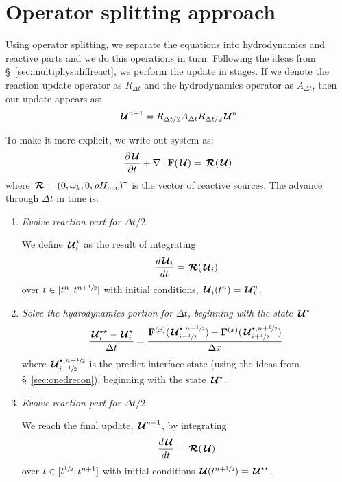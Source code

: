 \section{Operator splitting approach}

Using operator splitting, we separate the equations into hydrodynamics
and reactive parts and we do this operations in turn.  Following the
ideas from \S~\ref{sec:multiphys:diffreact}, we perform the update
in stages.  If we denote the reaction update operator as $R_{\Delta t}$
and the hydrodynamics operator as $A_{\Delta t}$, then our update 
appears as:
\begin{equation}
  {\,\boldsymbol{\mathcal{U}}}^{n+1} = R_{\Delta t/2} A_{\Delta t} R_{\Delta t/2} {\,\boldsymbol{\mathcal{U}}}^n
\end{equation}

To make it more explicit, we write out system as:
\begin{equation}
{\frac{{\partial{\,\boldsymbol{\mathcal{U}}}}}{\partial t}} + \nabla \cdot {\bf F}({\,\boldsymbol{\mathcal{U}}}) = {\,\boldsymbol{\mathcal{R}}}({\,\boldsymbol{\mathcal{U}}})
\end{equation}
where ${\,\boldsymbol{\mathcal{R}}} = (0, {\dot{\omega}}_k, 0, \rho {H_\mathrm{nuc}})^\intercal$ is the vector
of reactive sources.  The advance through $\Delta t$ in time is:
\begin{enumerate}
\item {\em Evolve reaction part for $\Delta t/2$}.

  We define ${\,\boldsymbol{\mathcal{U}}}_i^\star$ as the result of integrating
  \begin{equation}
    \frac{d{\,\boldsymbol{\mathcal{U}}}_i}{dt} = {\,\boldsymbol{\mathcal{R}}}({\,\boldsymbol{\mathcal{U}}}_i)
  \end{equation}
  over $t \in [t^n, t^{n+{\sfrac{1}{2}}}]$ with initial conditions, 
  ${\,\boldsymbol{\mathcal{U}}}_i(t^n) = {\,\boldsymbol{\mathcal{U}}}_i^n$.

\item {\em Solve the hydrodynamics portion for $\Delta t$, beginning
    with the state ${\,\boldsymbol{\mathcal{U}}}^\star$}
   \begin{equation}
     \frac{{\,\boldsymbol{\mathcal{U}}}^{\star\star}_i - {\,\boldsymbol{\mathcal{U}}}^\star_i}{\Delta t} =
      \frac{{\bf F}^{(x)}({\,\boldsymbol{\mathcal{U}}}^{\star,n+{\sfrac{1}{2}}}_{i-{\sfrac{1}{2}}}) - {\bf F}^{(x)}({\,\boldsymbol{\mathcal{U}}}^{\star,n+{\sfrac{1}{2}}}_{i+{\sfrac{1}{2}}})}{\Delta x}
   \end{equation}
  where ${\,\boldsymbol{\mathcal{U}}}^{\star,n+{\sfrac{1}{2}}}_{i-{\sfrac{1}{2}}}$ is the predict interface state
  (using the ideas from \S~\ref{sec:onedrecon}), beginning with the state
  ${\,\boldsymbol{\mathcal{U}}}^\star$.

\item {\em Evolve reaction part for $\Delta t/2$}

  We reach the final update, ${\,\boldsymbol{\mathcal{U}}}^{n+1}$, by integrating
  \begin{equation}
    \frac{d{\,\boldsymbol{\mathcal{U}}}}{dt} = {\,\boldsymbol{\mathcal{R}}}({\,\boldsymbol{\mathcal{U}}})
  \end{equation}
  over $t \in [t^{{\sfrac{1}{2}}}, t^{n+1}]$ with initial conditions
    ${\,\boldsymbol{\mathcal{U}}}(t^{n+{\sfrac{1}{2}}}) = {\,\boldsymbol{\mathcal{U}}}^{\star\star}$.

\end{enumerate}



